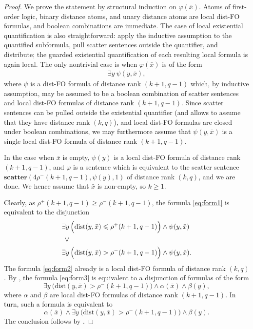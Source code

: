 \documentclass[11pt]{article}
\theoremstyle{remark}
\def\phi{\varphi}
\renewcommand{\le}{\leqslant}
\renewcommand{\ge}{\geqslant}
\newcommand{\dist}{\mathrm{dist}}
\newcommand{\distFO}{\textrm{\upshape dist-FO}\xspace}
\newcommand{\tup}{\bar}
\begin{document}
\begin{proof}
    We prove the statement by structural induction on $\phi(\tup x)$.
    Atoms of first-order logic, binary distance atoms, and unary distance atoms are local \distFO formulas, and boolean combinations are immediate.
    The case of local existential quantification is also straightforward: apply the inductive assumption to the quantified subformula, pull scatter sentences outside the quantifier, and distribute; the guarded existential quantification of each resulting local formula is again local.
    The only nontrivial case is when
    $\phi(\bar x)$ is of the form
    \begin{align}\label{eq:form1}
    \exists y~ \psi(y,\bar x),
    \end{align}
    where $\psi$ is a \distFO formula of distance rank $(k+1,q-1)$ which,
    by inductive assumption,
    may be assumed to be a boolean combination of scatter sentences and
    local \distFO formulas of distance rank $(k+1,q-1)$.
    Since scatter sentences can be pulled outside the existential quantifier
    (and  allows to assume that they have distance rank $(k,q)$),
    and local \distFO formulas are closed under boolean combinations, we may furthermore assume  that
    $\psi(y,\bar x)$
    is a single local \distFO formula of distance rank $(k+1,q-1)$.

    In the case when $\bar x$ is empty, $\psi(y)$ is a local \distFO formula of distance rank $(k+1,q-1)$, and $\phi$ is a sentence which is equivalent to the scatter sentence $\textbf{scatter}(4\rho^-(k+1,q-1),\psi(y),1)$ of distance rank $(k,q)$, and we are done.
    We hence assume that $\bar x$ is non-empty, so $k\ge 1$.

Clearly, as $\rho^+(k+1,q-1)\ge \rho^-(k+1,q-1)$, the formula \eqref{eq:form1}
is equivalent to the disjunction
\begin{align}
    \exists y&\,\Big(\dist(y,\bar x)\le\rho^+(k+1,q-1)\Big)\land \psi(y,\bar x)
    \label{eq:form2}\\\lor\notag&\\   \label{eq:form3}
    \exists y&\,\Big(\dist(y,\bar x)>\rho^-(k+1,q-1)\Big)\land \psi(y,\bar x).
    \end{align}
The formula \eqref{eq:form2}
already is a local \distFO formula
of distance rank $(k,q)$.
By ,
the formula
\eqref{eq:form3}
is equivalent
to
a disjunction of formulas of the form
$$\exists y~\Big(\dist(y,\bar x)>\rho^-(k+1,q-1)\Big)\land \alpha(\bar x)\land \beta(y),$$
where $\alpha$ and $\beta$ are local \distFO formulas of distance rank $(k+1,q-1)$.
In turn, such a formula is equivalent to
    $$\alpha(\bar x)\land \exists y~\Big(\dist(y,\bar x)>\rho^-(k+1,q-1)\Big)\land \beta(y).$$
The conclusion follows by .
\end{proof}

% 
\printbibliography
\end{document}
